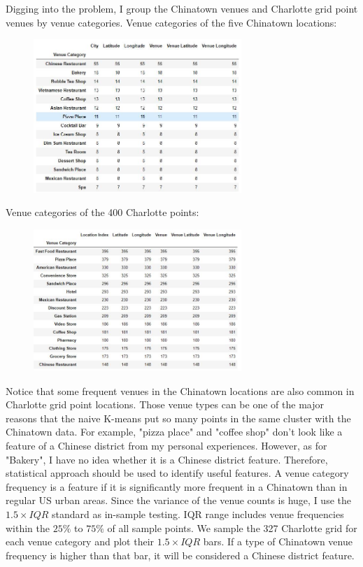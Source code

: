 \documentclass{article}
\begin{document}
Digging into the problem, I group the Chinatown venues and Charlotte grid point venues by venue categories.
Venue categories of the five Chinatown locations:
\begin{figure}[h!]
\includegraphics[width=0.7\textwidth]{csp1.jpg}
\centering
\end{figure}
Venue categories of the 400 Charlotte points:
\begin{figure}[h!]
\includegraphics[width=0.7\textwidth]{csp2.jpg}
\centering
\end{figure}
Notice that some frequent venues in the Chinatown locations are also common in Charlotte grid point locations.
Those venue types can be one of the major reasons that the naive K-means put so many points in the same cluster with the Chinatown data.
For example, "pizza place" and "coffee shop" don't look like a feature of a Chinese district from my personal experiences.
However, as for "Bakery", I have no idea whether it is a Chinese district feature.
Therefore, statistical approach should be used to identify useful features.
A venue category frequency is a feature if it is significantly more frequent in a Chinatown than in regular US urban areas.
Since the variance of the venue counts is huge, I use the $1.5 \times IQR$ standard as in-sample testing.
IQR range includes venue frequencies within the $25\%$ to $75\%$ of all sample points.
We sample the 327 Charlotte grid for each venue category and plot their $1.5 \times IQR$ bars. 
If a type of Chinatown venue frequency is higher than that bar, it will be considered a Chinese district feature.
\end{document}
